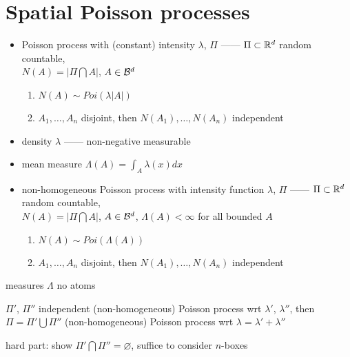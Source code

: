 \section{Spatial Poisson processes}\label{sec:spatial-poisson-processes}

\begin{itemize}
    \item Poisson process with (constant) intensity $\lambda$, $\Pi$ ------ $\Pi \subset \mathbb{R}^d$ random countable,\\
    $N(A) = |\Pi \bigcap A|$, $A \in \mathcal{B}^d$
    \begin{enumerate}
        \item $N(A) \sim Poi(\lambda |A|)$
        \item $A_1, \dots, A_n$ disjoint, then $N(A_1), \dots, N(A_n)$ independent
    \end{enumerate}
\end{itemize}

\begin{itemize}
    \item density $\lambda$ ------ non-negative measurable
    \item mean measure $\Lambda(A) = \int_A \lambda(x)dx$
    \item non-homogeneous Poisson process with intensity function $\lambda$, $\Pi$ ------ $\Pi \subset \mathbb{R}^d$ random countable,\\
     $N(A) = |\Pi \bigcap A|$, $A \in \mathcal{B}^d$, $\Lambda(A) < \infty$ for all bounded $A$
    \begin{enumerate}
        \item $N(A) \sim Poi(\Lambda(A))$
        \item $A_1, \dots, A_n$ disjoint, then $N(A_1), \dots, N(A_n)$ independent
    \end{enumerate}
\end{itemize}

\begin{fact}
    measures $\Lambda$ no atoms
\end{fact}

\begin{thm}
    $\Pi'$, $\Pi''$ independent (non-homogeneous) Poisson process wrt $\lambda'$, $\lambda''$, then
    $\Pi = \Pi' \bigcup \Pi''$ (non-homogeneous) Poisson process wrt $\lambda = \lambda' + \lambda''$
\end{thm}
\begin{pf}
    hard part: show $\Pi' \bigcap \Pi'' = \varnothing$, suffice to consider $n$-boxes
\end{pf}

